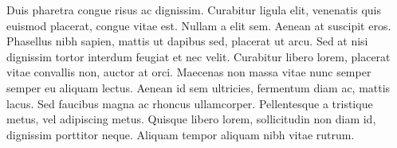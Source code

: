 Duis pharetra congue risus ac dignissim. Curabitur ligula elit, venenatis quis 
euismod placerat, congue vitae est. Nullam a elit sem. Aenean at suscipit eros. 
Phasellus nibh sapien, mattis ut dapibus sed, placerat ut arcu. Sed at nisi 
dignissim tortor interdum feugiat et nec velit. Curabitur libero lorem, placerat 
vitae convallis non, auctor at orci. Maecenas non massa vitae nunc semper semper 
eu aliquam lectus. Aenean id sem ultricies, fermentum diam ac, mattis lacus. Sed 
faucibus magna ac rhoncus ullamcorper. Pellentesque a tristique metus, vel 
adipiscing metus. Quisque libero lorem, sollicitudin non diam id, dignissim 
porttitor neque. Aliquam tempor aliquam nibh vitae rutrum.

